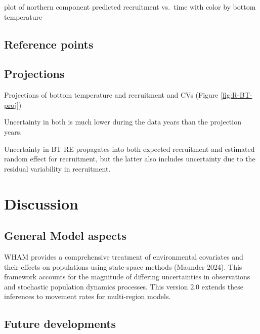 \documentclass[
]{article}
\begin{document}
plot of northern component predicted recruitment vs.~time with color by
bottom temperature

\hypertarget{reference-points-1}{%
\subsection*{Reference points}\label{reference-points-1}}

\hypertarget{projections-1}{%
\subsection*{Projections}\label{projections-1}}

Projections of bottom temperature and recruitment and CVs (Figure
\ref{fig:R-BT-proj})

Uncertainty in both is much lower during the data years than the
projection years.

Uncertainty in BT RE propagates into both expected recruitment and
estimated random effect for recruitment, but the latter also includes
uncertainty due to the residual variability in recruitment.

\hypertarget{discussion}{%
\section*{Discussion}\label{discussion}}

\hypertarget{general-model-aspects}{%
\subsection*{General Model aspects}\label{general-model-aspects}}

WHAM provides a comprehensive treatment of environmental covariates and
their effects on populations using state-space methods (Maunder 2024).
This framework accounts for the magnitude of differing uncertainties in
observations and stochastic population dynamics processes. This version
2.0 extends these inferences to movement rates for multi-region models.

\hypertarget{future-developments}{%
\subsection*{Future developments}\label{future-developments}}
\end{document}
